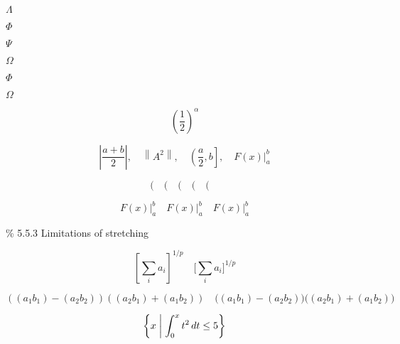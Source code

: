 \documentclass{article}
\begin{document}
$\varLambda$


$\Phi$

$\Psi$

$\Omega$

$\varPhi$

$\varOmega$



\[
	\left( \frac{1}{2} \right) ^{\alpha}
\]


\[
	\left|   \frac{a+b}{2} \right|, \quad
	\left\| A^{2}  \right\|,  \quad
	\left(   \frac{a}{2} , b \right], \quad
	\left. F(x) \right|_{a}^{b}
\]



\[
	(\quad  \big(\quad  \Big(\quad \bigg(\quad \Bigg(\quad
\]

\[
	F(x) |^{b}_{a} \quad
	F(x) \bigr |^{b}_{a} \quad
	F(x) \Bigr|^{b}_{a}
\]

\% 5.5.3 Limitations of stretching 

\[
	\left[  \sum_i a_i  \right]^{1/p} \quad
	\biggl[ \sum_i a_i \biggr]^{1/p}
\]


\[
	\left(  (a_1 b_1) -(a_2 b_2)  \right)
	\left( (a_2 b_1) + (a_1 b_2) \right)
	\quad
	\bigl( (a_1 b_1) -(a_2 b_2)  \bigr)
	\bigl( (a_2 b_1) + (a_1 b_2) \bigr)
\]



\[
	\left\{  x \biggm| \int_{0}^{x} t^{2}\, dt\leq 5  \right\}
\]
\end{document}
